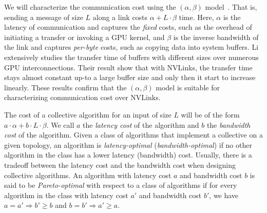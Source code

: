 We will characterize the communication cost using the $(\alpha, \beta)$ model~\cite{hockney1994communication}. That is, sending a message of size $L$ along a link costs $\alpha + L\cdot\beta$ time.
Here, $\alpha$ is the latency of communication and captures the {\em fixed} costs, such as the overhead of initiating a transfer or invoking a GPU kernel,
and $\beta$ is the inverse bandwidth of the link and captures {\em per-byte} costs, such as copying data into system buffers. Li \etal{} extensively studies the transfer time of buffers with
different sizes over numerous GPU interconnections\cite{alphabeta}. Their result show that with NVLinks, the transfer time stays almost constant up-to a large buffer size and only then it start to increase linearly.
These results confirm that the $(\alpha,\beta)$ model is suitable for characterizing communication cost over NVLinks.

The cost of a collective algorithm for an input of size $L$ will be of the form $a\cdot\alpha + b \cdot L \cdot \beta$. We call $a$ the {\em latency cost} of the algorithm and $b$ the {\em bandwidth cost} of the algorithm. Given a class of algorithms that implement a collective on a given topology, an algorithm is {\em latency-optimal} ({\em bandwidth-optimal}) if no other algorithm in the class has a lower latency (bandwidth) cost. Usually, there is a tradeoff between the latency cost and the bandwidth cost when designing collective algorithms.  An algorithm with latency cost $a$ and bandwidth cost $b$ is said to be {\em Pareto-optimal} with respect to a class of algorithms if for every algorithm in the class with latency cost $a'$ and bandwidth cost $b'$, we have $a = a' \Rightarrow b' \geq b$ and $b = b' \Rightarrow  a' \geq a$.


